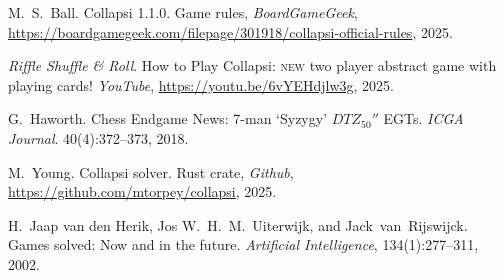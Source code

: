 \documentclass[a4paper, twocolumn]{article}
\begin{document}
\begin{thebibliography}{9}

  M.~S.~Ball.
  Collapsi 1.1.0.
  Game rules,
  \textit{BoardGameGeek},
  \url{https://boardgamegeek.com/filepage/301918/collapsi-official-rules},
  2025.

  \textit{Riffle Shuffle \& Roll}.
  How to Play Collapsi: \textsc{new} two player abstract game with playing cards!
  \textit{YouTube},
  \url{https://youtu.be/6vYEHdjlw3g},
  2025.

  G.~Haworth.
  Chess Endgame News: 7-man `Syzygy' $DTZ_{50}''$ EGTs.
  \textit{ICGA Journal}. 40(4):372--373,
  2018.

  M.~Young.
  Collapsi solver.
  Rust crate,
  \textit{Github},
  \url{https://github.com/mtorpey/collapsi},
  2025.

  H.~Jaap van den Herik, Jos W.~H.~M.~Uiterwijk, and Jack~van~Rijswijck.
  Games solved: Now and in the future.
  \textit{Artificial Intelligence}, 134(1):277--311,
  2002.

\end{thebibliography}
\end{document}

